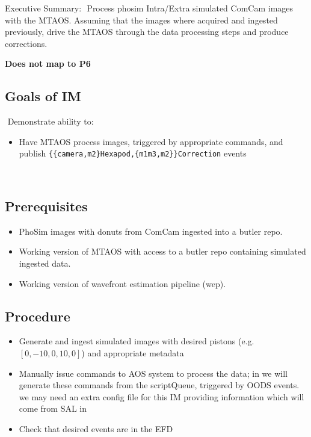 Executive Summary:
​
Process phosim Intra/Extra simulated ComCam images with the MTAOS.
Assuming that the images where acquired and ingested previously, drive the MTAOS through the data processing steps and produce corrections.

\textbf{Does not map to P6}
​
\subsection{Goals of IM}
​
Demonstrate ability to:
​
\begin{itemize}
\item Have MTAOS process images, triggered by appropriate commands, and publish
  \texttt{\{\{camera,m2\}Hexapod,\{m1m3,m2\}\}Correction} events
\end{itemize}
​
\subsection{Prerequisites}
\begin{itemize}
\item PhoSim images with donuts from ComCam ingested into a butler repo.
\item Working version of MTAOS with access to a butler repo containing simulated ingested data.
\item Working version of wavefront estimation pipeline (wep). 
\end{itemize}

\subsection{Procedure}
\begin{itemize}
\item Generate and ingest simulated images with desired pistons (e.g. $[0, -10, 0, 10, 0]$) and appropriate
  metadata
\item Manually issue commands to AOS system to process the data; in  we will generate these
  commands from the \gls{scriptQueue}, triggered by \gls{OODS} events.
    \Nb we may need an extra config file for this IM providing information which will
    come from SAL in 
\item Check that desired events are in the EFD
\end{itemize}
